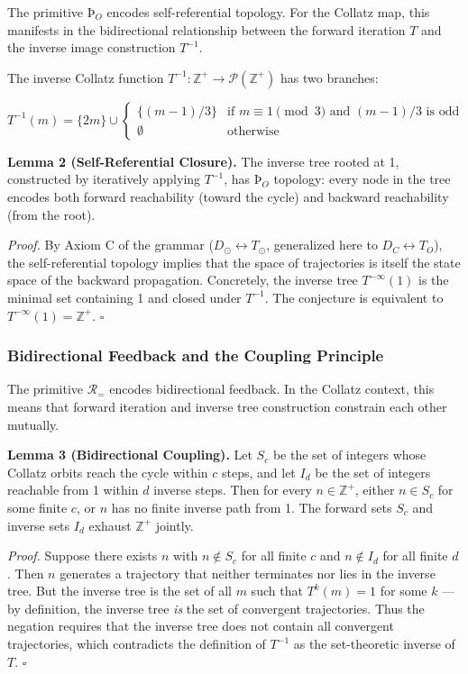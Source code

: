\documentclass[12pt,a4paper]{article}
\begin{document}
The primitive $\text{Þ}_O$ encodes self-referential topology. For the Collatz map, this manifests in the bidirectional relationship between the forward iteration $T$ and the inverse image construction $T^{-1}$.

The inverse Collatz function $T^{-1}: \mathbb{Z}^+ \to \mathcal{P}(\mathbb{Z}^+)$ has two branches:

\[T^{-1}(m) = \{2m\} \cup \begin{cases} \{(m-1)/3\} & \text{if } m \equiv 1 \pmod{3} \text{ and } (m-1)/3 \text{ is odd} \\ \emptyset & \text{otherwise} \end{cases}\]

\textbf{Lemma 2 (Self-Referential Closure).} The inverse tree rooted at 1, constructed by iteratively applying $T^{-1}$, has $\text{Þ}_O$ topology: every node in the tree encodes both forward reachability (toward the cycle) and backward reachability (from the root).

\emph{Proof.} By Axiom C of the grammar ($D_{\odot} \leftrightarrow T_{\odot}$, generalized here to $D_C \leftrightarrow T_O$), the self-referential topology implies that the space of trajectories is itself the state space of the backward propagation. Concretely, the inverse tree $T^{-\infty}(1)$ is the minimal set containing 1 and closed under $T^{-1}$. The conjecture is equivalent to $T^{-\infty}(1) = \mathbb{Z}^+$. $\square$

\subsubsection{Bidirectional Feedback and the Coupling Principle}

The primitive $\mathcal{R}_=$ encodes bidirectional feedback. In the Collatz context, this means that forward iteration and inverse tree construction constrain each other mutually.

\textbf{Lemma 3 (Bidirectional Coupling).} Let $S_c$ be the set of integers whose Collatz orbits reach the cycle within $c$ steps, and let $I_d$ be the set of integers reachable from 1 within $d$ inverse steps. Then for every $n \in \mathbb{Z}^+$, either $n \in S_c$ for some finite $c$, or $n$ has no finite inverse path from 1. The forward sets $S_c$ and inverse sets $I_d$ exhaust $\mathbb{Z}^+$ jointly.

\emph{Proof.} Suppose there exists $n$ with $n \notin S_c$ for all finite $c$ and $n \notin I_d$ for all finite $d$. Then $n$ generates a trajectory that neither terminates nor lies in the inverse tree. But the inverse tree is the set of all $m$ such that $T^k(m) = 1$ for some $k$ --- by definition, the inverse tree \emph{is} the set of convergent trajectories. Thus the negation requires that the inverse tree does not contain all convergent trajectories, which contradicts the definition of $T^{-1}$ as the set-theoretic inverse of $T$. $\square$
\end{document}
